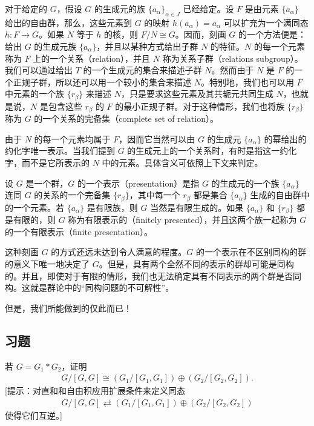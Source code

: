 \documentclass[../../main.tex]{subfiles}
\begin{document}
对于给定的 $G$，假设 $G$ 的生成元的族 $\{a_\alpha\}_{\alpha\in J}$ 已经给定。设 $F$ 是由元素 $\{a_\alpha\}$ 给出的自由群，那么，这些元素到 $G$ 的映射 $h(a_\alpha)=a_\alpha$ 可以扩充为一个满同态 $h:F\to G$。如果 $N$ 等于 $h$ 的核，则 $F/N\cong G$。因而，刻画 $G$ 的一个方法便是：给出 $G$ 的生成元族 $\{a_\alpha\}$，并且以某种方式给出子群 $N$ 的特征。$N$ 的每一个元素称为 $F$ 上的一个关系（relation），并且 $N$ 称为关系子群（relations subgroup）。我们可以通过给出 $T$ 的一个生成元的集合来描述子群 $N$。然而由于 $N$ 是 $F$ 的一个正规子群，所以还可以用一个较小的集合来描述 $N$。特别地，我们也可以用 $F$ 中元素的一个族 $\{r_\beta\}$ 来描述 $N$，只是要求这些元素及其共轭元共同生成 $N$，也就是说，$N$ 是包含这些 $r_\beta$ 的 $F$ 的最小正规子群。对于这种情形，我们也将族 $\{r_\beta\}$ 称为 $G$ 的一个关系的完备集（complete set of relation）。

由于 $N$ 的每一个元素均属于 $F$，因而它当然可以由 $G$ 的生成元 $\{a_\alpha\}$ 的幂给出的约化字唯一表示。当我们提到 $G$ 的生成元上的一个关系时，有时是指这一约化字，而不是它所表示的 $N$ 中的元素。具体含义可依照上下文来判定。

\begin{definition}[群的表示]\label{definition:ch11-group-presentation}
设 $G$ 是一个群，$G$ 的一个表示（presentation）是指 $G$ 的生成元的一个族 $\{a_\alpha\}$ 连同 $G$ 的关系的一个完备集 $\{r_\beta\}$，其中每一个 $r_\beta$ 都是集合 $\{a_\alpha\}$ 生成的自由群中的一个元素。若 $\{a_\alpha\}$ 是有限族，则 $G$ 当然是有限生成的。如果 $\{a_\alpha\}$ 和 $\{r_\beta\}$ 都是有限的，则 $G$ 称为有限表示的（finitely presented），并且这两个族一起称为 $G$ 的一个有限表示（finite presentation）。
\end{definition}

这种刻画 $G$ 的方式还远未达到令人满意的程度。$G$ 的一个表示在不区别同构的群的意义下唯一地决定了 $G$。但是，具有两个全然不同的表示的群却可能是同构的。并且，即使对于有限的情形，我们也无法确定具有不同表示的两个群是否同构。这就是群论中的“同构问题的不可解性”。

但是，我们所能做到的仅此而已！

\subsection*{习题}

\begin{exercise}\label{exercise:ch11-69-01}
若 $G=G_1*G_2$，证明
\begin{align*}
G/[G,G]\cong(G_1/[G_1,G_1])\oplus(G_2/[G_2,G_2]).
\end{align*}
[提示：对直和和自由积应用扩展条件来定义同态
\begin{align*}
G/[G,G]\rightleftarrows(G_1/[G_1,G_1])\oplus(G_2/[G_2,G_2])
\end{align*}
使得它们互逆。]
\end{exercise}
\end{document}
